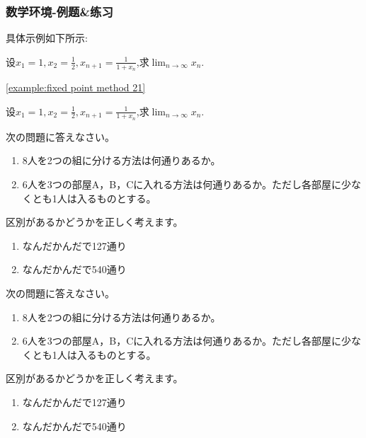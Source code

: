 \subsubsection{数学环境-例题\&练习}
具体示例如下所示:
\begin{example}[][exam:1.1]
    \label{example:fixed point method 21}
    设$\displaystyle x_1=1,x_2=\frac{1}{2},x_{n+1}=\frac{1}{1+x_n}$,求$\displaystyle\lim_{n\to\infty}x_n$.
\end{example}
\ref{example:fixed point method 21}
\begin{tcblisting}{}
\begin{example}[][exam:1.1]
    \label{example:fixed point method 2}
    设$\displaystyle x_1=1,x_2=\frac{1}{2},x_{n+1}=\frac{1}{1+x_n}$,求$\displaystyle\lim_{n\to\infty}x_n$.
\end{example}
\end{tcblisting}
%
\begin{tcblisting}{}
\begin{reidai}
    次の問題に答えなさい。
    \begin{enumerate}
        \item 8人を2つの組に分ける方法は何通りあるか。
        \item 6人を3つの部屋A，B，Cに入れる方法は何通りあるか。ただし各部屋に少なくとも1人は入るものとする。
    \end{enumerate}
    \tcblower
    区別があるかどうかを正しく考えます。
    \begin{enumerate}
        \item なんだかんだで127通り
        \item なんだかんだで540通り
    \end{enumerate}
\end{reidai}
\end{tcblisting}
%
\begin{reidai}
次の問題に答えなさい。
\begin{enumerate}
    \item 8人を2つの組に分ける方法は何通りあるか。
    \item 6人を3つの部屋A，B，Cに入れる方法は何通りあるか。ただし各部屋に少なくとも1人は入るものとする。
\end{enumerate}
\tcblower
区別があるかどうかを正しく考えます。
\begin{enumerate}
    \item なんだかんだで127通り
    \item なんだかんだで540通り
\end{enumerate}
\end{reidai}
